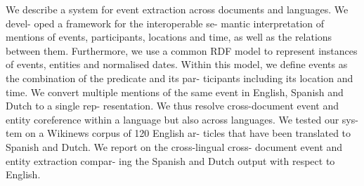We describe a system for event extraction across documents and languages. We devel- oped a framework for the interoperable se- mantic interpretation of mentions of events, participants, locations and time, as well as the relations between them. Furthermore, we use a common RDF model to represent instances of events, entities and normalised dates. Within this model, we define events as the combination of the predicate and its par- ticipants including its location and time. We convert multiple mentions of the same event in English, Spanish and Dutch to a single rep- resentation. We thus resolve cross-document event and entity coreference within a language but also across languages. We tested our sys- tem on a Wikinews corpus of 120 English ar- ticles that have been translated to Spanish and Dutch. We report on the cross-lingual cross- document event and entity extraction compar- ing the Spanish and Dutch output with respect to English.
